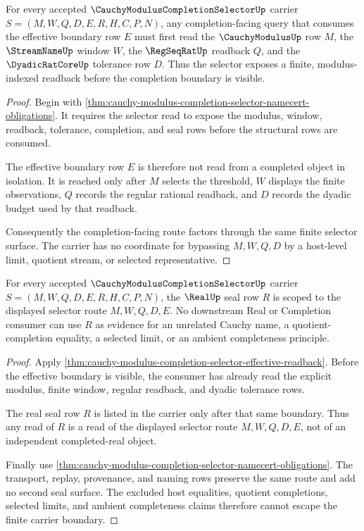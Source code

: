 \begin{theorem}\label{thm:cauchy-modulus-completion-selector-effective-readback}
For every accepted $\CauchyModulusCompletionSelectorUp$ carrier
$S=(M,W,Q,D,E,R,H,C,P,N)$, any completion-facing query that consumes the
effective boundary row $E$ must first read the $\CauchyModulusUp$ row $M$, the
$\StreamNameUp$ window $W$, the $\RegSeqRatUp$ readback $Q$, and the
$\DyadicRatCoreUp$ tolerance row $D$. Thus the selector exposes a finite,
modulus-indexed readback before the completion boundary is visible.
\end{theorem}
\begin{proof}
Begin with
\autoref{thm:cauchy-modulus-completion-selector-namecert-obligations}. It
requires the selector read to expose the modulus, window, readback, tolerance,
completion, and seal rows before the structural rows are consumed.

The effective boundary row $E$ is therefore not read from a completed object in
isolation. It is reached only after $M$ selects the threshold, $W$ displays the
finite observations, $Q$ records the regular rational readback, and $D$ records
the dyadic budget used by that readback.

Consequently the completion-facing route factors through the same finite
selector surface. The carrier has no coordinate for bypassing $M,W,Q,D$ by a
host-level limit, quotient stream, or selected representative.
\end{proof}

\begin{theorem}\label{thm:cauchy-modulus-completion-selector-real-seal-nonescape}
For every accepted $\CauchyModulusCompletionSelectorUp$ carrier
$S=(M,W,Q,D,E,R,H,C,P,N)$, the $\RealUp$ seal row $R$ is scoped to the displayed
selector route $M,W,Q,D,E$. No downstream Real or Completion consumer can use
$R$ as evidence for an unrelated Cauchy name, a quotient-completion equality,
a selected limit, or an ambient completeness principle.
\end{theorem}
\begin{proof}
Apply
\autoref{thm:cauchy-modulus-completion-selector-effective-readback}. Before
the effective boundary is visible, the consumer has already read the explicit
modulus, finite window, regular readback, and dyadic tolerance rows.

The real seal row $R$ is listed in the carrier only after that same boundary.
Thus any read of $R$ is a read of the displayed selector route
$M,W,Q,D,E$, not of an independent completed-real object.

Finally use
\autoref{thm:cauchy-modulus-completion-selector-namecert-obligations}. The
transport, replay, provenance, and naming rows preserve the same route and add
no second seal surface. The excluded host equalities, quotient completions,
selected limits, and ambient completeness claims therefore cannot escape the
finite carrier boundary.
\end{proof}

